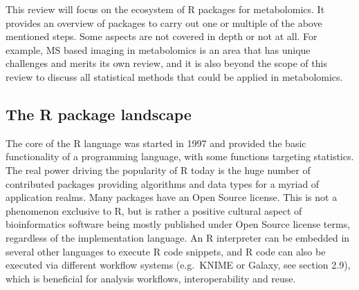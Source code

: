 \documentclass[]{article}
\begin{document}
This review will focus on the ecosystem of R packages for metabolomics. It provides an overview of packages to carry out one or multiple of the above mentioned steps. Some aspects are not covered in depth or not at all. For example, MS based imaging in metabolomics is an area that has unique challenges and merits its own review, and it is also beyond the scope of this review to discuss all statistical methods that could be applied in metabolomics.

\newpage

\hypertarget{the-r-package-landscape}{%
\subsection{The R package landscape}\label{the-r-package-landscape}}

The core of the R language was started in 1997 and provided the basic functionality of a programming language, with some functions targeting statistics. The real power driving the popularity of R today is the huge number of contributed packages providing algorithms and data types for a myriad of application realms. Many packages have an Open Source license. This is not a phenomenon exclusive to R, but is rather a positive cultural aspect of bioinformatics software being mostly published under Open Source license terms, regardless of the implementation language. An R interpreter can be embedded in several other languages to execute R code snippets, and R code can also be executed via different workflow systems (e.g.~KNIME or Galaxy, see section 2.9), which is beneficial for analysis workflows, interoperability and reuse.
\end{document}
